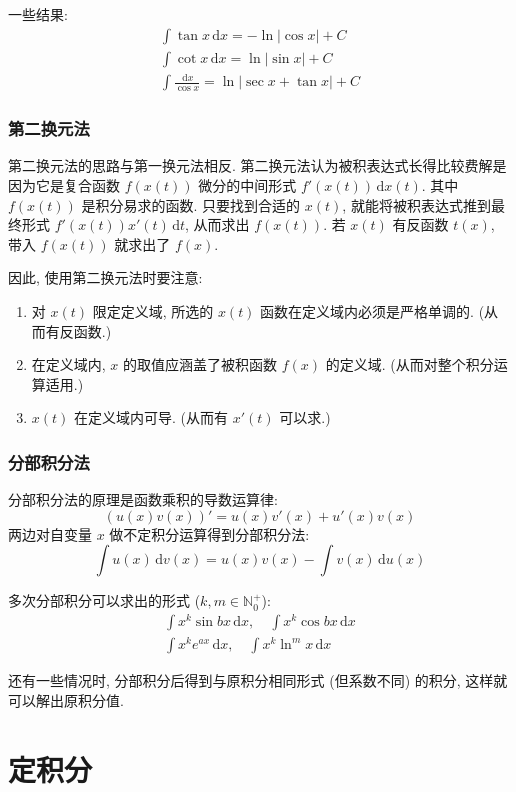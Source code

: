 \documentclass{book}
\newcommand{\dd}{\,\mathrm{d}}
\newcommand{\abs}[1]{\left\lvert #1 \right\rvert}
\newcommand{\N}{\mathbb{N}}
\numberwithin{equation}{section}
\numberwithin{figure}{section}
\theoremstyle{definition}
\begin{document}
一些结果:
\begin{gather*}
  \int \tan x\dd x=-\ln\abs{\cos x}+C\\
  \int \cot x\dd x=\ln\abs{\sin x}+C\\
  \int \frac{\dd x}{\cos x}=\ln\abs{\sec x+\tan x}+C
\end{gather*}
\subsection{第二换元法}
第二换元法的思路与第一换元法相反. 第二换元法认为被积表达式长得比较费解是因为它是复合函数 $f(x(t))$ 微分的中间形式 $f'(x(t))\dd x(t)$. 其中 $f(x(t))$ 是积分易求的函数. 只要找到合适的 $x(t)$, 就能将被积表达式推到最终形式 $f'(x(t))x'(t)\dd t$, 从而求出 $f(x(t))$. 若 $x(t)$ 有反函数 $t(x)$, 带入 $f(x(t))$ 就求出了 $f(x)$.

因此, 使用第二换元法时要注意:
\begin{enumerate}
  \item 对 $x(t)$ 限定定义域, 所选的 $x(t)$ 函数在定义域内必须是严格单调的. (从而有反函数.)
  \item 在定义域内, $x$ 的取值应涵盖了被积函数 $f(x)$ 的定义域. (从而对整个积分运算适用.)
  \item $x(t)$ 在定义域内可导. (从而有 $x'(t)$ 可以求.)
\end{enumerate}
\subsection{分部积分法}
分部积分法的原理是函数乘积的导数运算律:
\begin{equation*}
  (u(x)v(x))'=u(x)v'(x)+u'(x)v(x)
\end{equation*}
两边对自变量 $x$ 做不定积分运算得到分部积分法:
\begin{equation*}
  \int u(x)\dd v(x)=u(x)v(x)-\int v(x)\dd u(x)
\end{equation*}

多次分部积分可以求出的形式 ($k,m\in\N_0^+$):
\begin{gather*}
  \int x^k \sin bx\dd x,\quad \int x^k \cos bx \dd x\\
  \int x^k e^{ax}\dd x,\quad \int x^k\ln^m x\dd x
\end{gather*}

还有一些情况时, 分部积分后得到与原积分相同形式 (但系数不同) 的积分, 这样就可以解出原积分值.
\chapter{定积分}
\end{document}
